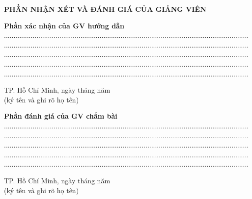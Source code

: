 	\begin{center}
		\fontsize{16}{20}\selectfont
		\textbf{PHẦN NHẬN XÉT VÀ ĐÁNH GIÁ CỦA GIẢNG VIÊN}\\
	\end{center}
	\fontsize{13}{13}\selectfont
	\textbf{Phần xác nhận của GV hướng dẫn}\\
	................................................................................................................................\\
	................................................................................................................................\\
	................................................................................................................................\\
	................................................................................................................................\\
	................................................................................................................................\\
	\begin{flushright}
		TP. Hồ Chí Minh,  ngày   tháng   năm   \\ 
		(ký tên và ghi rõ họ tên)\\
		\vspace{3cm}
	\end{flushright}
	\setstretch{1.5}
	\fontsize{13}{13}\selectfont
	\textbf{Phần đánh giá của GV chấm bài}\\
	................................................................................................................................\\
	................................................................................................................................\\
	................................................................................................................................\\
	................................................................................................................................\\
	................................................................................................................................\\
	\begin{flushright}
		TP. Hồ Chí Minh,  ngày   tháng   năm   \\ 
		(ký tên và ghi rõ họ tên)\\
		\vspace{3cm}
	\end{flushright}
	\pagebreak
	
